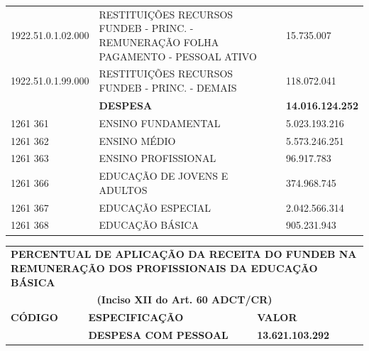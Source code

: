 \documentclass{article}
\begin{document}
\begin{longtable}[c]{m{2.5cm}|m{14cm}|m{1.5cm}}
\multicolumn{1}{L{2.5cm}|}{1922.51.0.1.02.000} & \multicolumn{1}{L{14cm}|}{RESTITUIÇÕES RECURSOS FUNDEB - PRINC. - REMUNERAÇÃO FOLHA PAGAMENTO - PESSOAL ATIVO} & \multicolumn{1}{R{1.5cm}}{15.735.007} \\
\multicolumn{1}{L{2.5cm}|}{1922.51.0.1.99.000} & \multicolumn{1}{L{14cm}|}{RESTITUIÇÕES RECURSOS FUNDEB - PRINC. - DEMAIS} & \multicolumn{1}{R{1.5cm}}{118.072.041} \\
\hline
\multicolumn{1}{L{2.5cm}|}{ \textbf{}} & \multicolumn{1}{L{14cm}|}{ \textbf{DESPESA}} & \multicolumn{1}{R{1.5cm}}{ \textbf{14.016.124.252}} \\
\multicolumn{1}{L{2.5cm}|}{1261 361} & \multicolumn{1}{L{14cm}|}{ENSINO FUNDAMENTAL} & \multicolumn{1}{R{1.5cm}}{5.023.193.216} \\
\multicolumn{1}{L{2.5cm}|}{1261 362} & \multicolumn{1}{L{14cm}|}{ENSINO MÉDIO} & \multicolumn{1}{R{1.5cm}}{5.573.246.251} \\
\multicolumn{1}{L{2.5cm}|}{1261 363} & \multicolumn{1}{L{14cm}|}{ENSINO PROFISSIONAL} & \multicolumn{1}{R{1.5cm}}{96.917.783} \\
\multicolumn{1}{L{2.5cm}|}{1261 366} & \multicolumn{1}{L{14cm}|}{EDUCAÇÃO DE JOVENS E ADULTOS} & \multicolumn{1}{R{1.5cm}}{374.968.745} \\
\multicolumn{1}{L{2.5cm}|}{1261 367} & \multicolumn{1}{L{14cm}|}{EDUCAÇÃO ESPECIAL} & \multicolumn{1}{R{1.5cm}}{2.042.566.314} \\
\multicolumn{1}{L{2.5cm}|}{1261 368} & \multicolumn{1}{L{14cm}|}{EDUCAÇÃO BÁSICA} & \multicolumn{1}{R{1.5cm}}{905.231.943} \\\hline\hline\end{longtable}\noindent\begin{longtable}[c]{m{3cm}|m{12cm}|m{3cm}}\multicolumn{3}{C{19cm}}{\cellcolor{gray!50} \textcolor{myblack} {\footnotesize \textbf{PERCENTUAL DE APLICAÇÃO DA RECEITA DO FUNDEB NA REMUNERAÇÃO DOS PROFISSIONAIS \newline DA EDUCAÇÃO BÁSICA}}} \\\multicolumn{3}{c}{\cellcolor{gray!50} \textcolor{myblack} {\footnotesize \textbf{(Inciso XII do Art. 60 ADCT/CR)}}} \\\hline\hline \multicolumn{1}{L{3cm}|}{\textbf{CÓDIGO}} & \multicolumn{1}{C{12cm}|}{ \textbf{ESPECIFICAÇÃO}} & \multicolumn{1}{C{3cm}}{ \textbf{VALOR}} \\\hline\hline \hline\hline
\multicolumn{1}{L{3cm}|}{ \textbf{}} & \multicolumn{1}{L{12cm}|}{ \textbf{DESPESA COM PESSOAL}} & \multicolumn{1}{R{3cm}}{ \textbf{13.621.103.292}} \\

\end{longtable}
\end{document}
